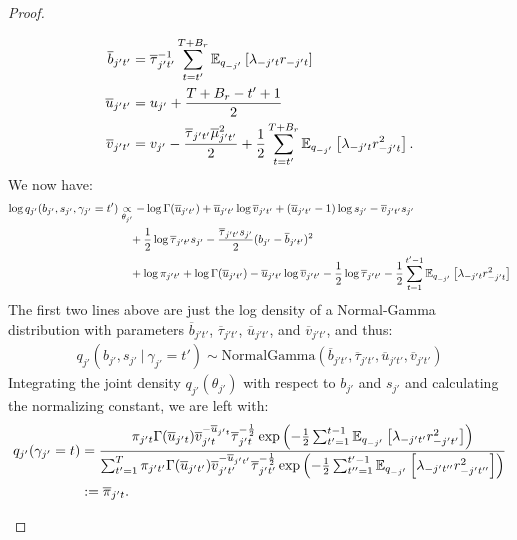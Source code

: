\begin{proof}
\begin{enumerate}[label=\roman*.]
\begin{align*}
    \overline{b}_{j't'}  &= \overline{\tau}_{j't'}^{-1}  \sum_{t=t'}^{T+B_r} \mathbb{E}_{q_{-j'}}\left[\lambda_{-j't}r_{-j't}\right] \\
    \overline{u}_{j't'} &= u_{j'} + \frac{T+B_r-t'+1}{2} \\
    \overline{v}_{j't'} &= v_{j'} - \frac{\overline{\tau}_{j't'}\overline{\mu}^2_{j't'}}{2} + \frac{1}{2}\sum_{t=t'}^{T+B_r}\mathbb{E}_{q_{-j'}}\left[\lambda_{-j't}r^2_{-j't}\right].
\end{align*}
We now have:
\begin{align*}
    \log q_{j'}(b_{j'}, s_{j'}, \gamma_{j'} = t')
    &\underset{\theta_{j'}}{\propto} -\log\Gamma(\overline{u}_{j't'}) + \overline{u}_{j't'} \log \overline{v}_{j't'}  + \left(\overline{u}_{j't'} -1\right)\log s_{j'}  - \overline{v}_{j't'} s_{j'} \\
    &\quad + \frac{1}{2}\log \overline{\tau}_{j't'}s_{j'} - \frac{\overline{\tau}_{j't'} s_{j'}}{2} (b_{j'} - \overline{b}_{j't'} )^2 \\
    &\quad + \log \pi_{j't'} + \log\Gamma(\overline{u}_{j't'}) - \overline{u}_{j't'} \log \overline{v}_{j't'} - \frac{1}{2}\log \overline{\tau}_{j't'} -\frac{1}{2} \sum_{t=1}^{t'-1} \mathbb{E}_{q_{-j'}}\left[\lambda_{-j't}r_{-j't}^2\right] 
\end{align*}
The first two lines above are just the log density of a Normal-Gamma distribution with parameters $\overline{b}_{j't'} $, $\overline{\tau}_{j't'}$, $\overline{u}_{j't'}$, and $\overline{v}_{j't'}$, and thus: 
\begin{align*}
    q_{j'}(b_{j'}, s_{j'} \:|\: \gamma_{j'} = t') \sim \text{NormalGamma}(\overline{b}_{j't'} , \overline{\tau}_{j't'}, \overline{u}_{j't'}, \overline{v}_{j't'})
\end{align*}
Integrating the joint density $q_{j'}(\theta_{j'})$ with respect to $b_{j'}$ and $s_{j'}$ and calculating the normalizing constant, we are left with:
\begin{align*}
    q_{j'}(\gamma_{j'} = t) &= \frac{\pi_{j't}\Gamma(\overline{u}_{j't})\overline{v}_{j't}^{-\overline{u}_{j't}}\overline{\tau}_{j't}^{-\frac{1}{2}}\exp\left( -\frac{1}{2} \sum_{t'=1}^{t-1} \mathbb{E}_{q_{-j'}}\left[\lambda_{-j't'}r_{-j't'}^2\right] \right)}{\sum_{t'=1}^T \pi_{j't'}\Gamma(\overline{u}_{j't'})\overline{v}_{j't'}^{-\overline{u}_{j't'}}\overline{\tau}_{j't'}^{-\frac{1}{2}}\exp\left( -\frac{1}{2} \sum_{t''=1}^{t'-1} \mathbb{E}_{q_{-j'}}\left[\lambda_{-j't''}r_{-j't''}^2\right] \right)} \\
    &:= \overline{\pi}_{j't}. 
\end{align*}

\end{enumerate}
\end{proof}

